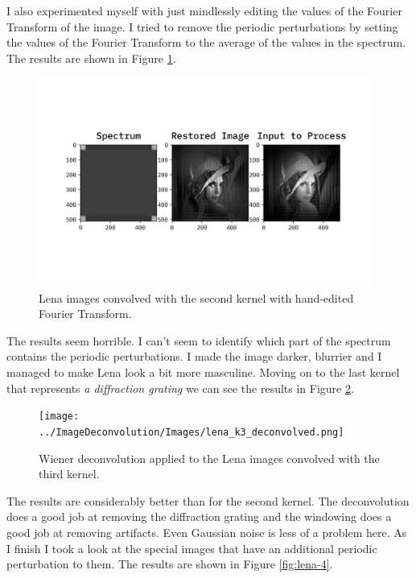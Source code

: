 \documentclass[10pt, titlepage, a4paper]{article}
\begin{document}
I also experimented myself with just mindlessly editing the values of the Fourier Transform of the image. I tried to
remove the periodic perturbations by setting the values of the Fourier Transform to the average of the values in the
spectrum. The results are shown in Figure \ref{fig:lena-2-averaging}.

\begin{figure}[H]
    \centering
    \includegraphics[width=0.98\textwidth]{../ImageDeconvolution/Images/lena_k2_deconvolved_spectra.png}
    \caption{Lena images convolved with the second kernel with hand-edited Fourier Transform.}
    \label{fig:lena-2-averaging}
\end{figure}

The results seem horrible. I can't seem to identify which part of the spectrum contains the periodic perturbations.
I made the image darker, blurrier and I managed to make Lena look a bit more masculine. Moving on to the last 
kernel that represents \textit{a diffraction grating} we can see the results in Figure \ref{fig:lena-3}.

\begin{figure}[H]
    \centering
    \texttt{[image: ../ImageDeconvolution/Images/lena\_k3\_deconvolved.png]}
    \caption{Wiener deconvolution applied to the Lena images convolved with the third kernel.}
    \label{fig:lena-3}
\end{figure}

The results are considerably better than for the second kernel. The deconvolution does a good job at removing the
diffraction grating and the windowing does a good job at removing artifacts. Even Gaussian noise is less of a problem
here. As I finish I took a look at the special images that have an additional periodic perturbation to them. The results
are shown in Figure \ref{fig:lena-4}.
\end{document}
